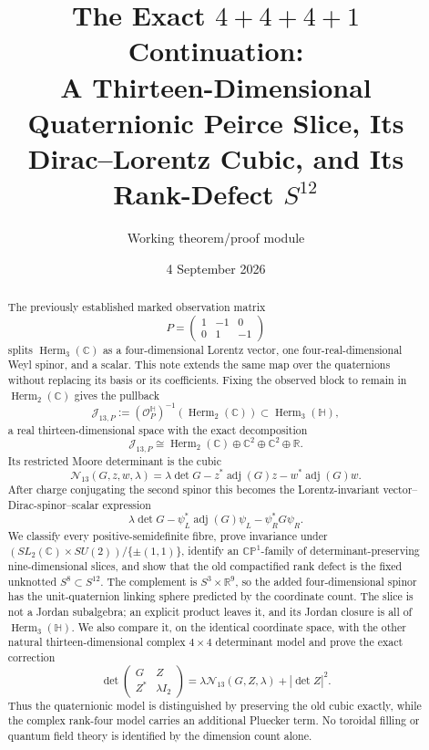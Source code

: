 \documentclass[11pt]{article}
\title{The Exact \texorpdfstring{$4+4+4+1$}{4+4+4+1} Continuation:\\
A Thirteen-Dimensional Quaternionic Peirce Slice, Its Dirac--Lorentz Cubic, and Its Rank-Defect \texorpdfstring{$S^{12}$}{S12}}
\author{Working theorem/proof module}
\date{4 September 2026}
\theoremstyle{definition}
\theoremstyle{remark}
\newcommand{\C}{\mathbb C}
\newcommand{\Hh}{\mathbb H}
\newcommand{\R}{\mathbb R}
\newcommand{\Z}{\mathbb Z}
\newcommand{\CP}{\mathbb {CP}}
\newcommand{\Herm}{\operatorname{Herm}}
\newcommand{\adj}{\operatorname{adj}}
\newcommand{\cJ}{\mathcal J}
\newcommand{\cN}{\mathcal N}
\newcommand{\cO}{\mathcal O}
\begin{document}
\maketitle

\begin{abstract}
The previously established marked observation matrix
\[
 P=\begin{pmatrix}1&-1&0\\0&1&-1\end{pmatrix}
\]
splits $\Herm_3(\C)$ as a four-dimensional Lorentz vector, one four-real-dimensional Weyl spinor, and a scalar.  This note extends the same map over the quaternions without replacing its basis or its coefficients.  Fixing the observed block to remain in $\Herm_2(\C)$ gives the pullback
\[
 \cJ_{13,P}:=(\cO_P^{\Hh})^{-1}(\Herm_2(\C))\subset\Herm_3(\Hh),
\]
a real thirteen-dimensional space with the exact decomposition
\[
 \cJ_{13,P}\cong\Herm_2(\C)\oplus\C^2\oplus\C^2\oplus\R.
\]
Its restricted Moore determinant is the cubic
\[
 \cN_{13}(G,z,w,\lambda)
 =\lambda\det G-z^*\adj(G)z-w^*\adj(G)w.
\]
After charge conjugating the second spinor this becomes the Lorentz-invariant vector--Dirac-spinor--scalar expression
\[
 \lambda\det G-\psi_L^*\adj(G)\psi_L-\psi_R^*G\psi_R.
\]
We classify every positive-semidefinite fibre, prove invariance under
$(SL_2(\C)\times SU(2))/\{\pm(1,1)\}$, identify an $\CP^1$-family of determinant-preserving nine-dimensional slices, and show that the old compactified rank defect is the fixed unknotted $S^8\subset S^{12}$.  The complement is $S^3\times\R^9$, so the added four-dimensional spinor has the unit-quaternion linking sphere predicted by the coordinate count.  The slice is not a Jordan subalgebra; an explicit product leaves it, and its Jordan closure is all of $\Herm_3(\Hh)$.  We also compare it, on the identical coordinate space, with the other natural thirteen-dimensional complex $4\times4$ determinant model and prove the exact correction
\[
 \det\begin{pmatrix}G&Z\\Z^*&\lambda I_2\end{pmatrix}
 =\lambda\cN_{13}(G,Z,\lambda)+|\det Z|^2.
\]
Thus the quaternionic model is distinguished by preserving the old cubic exactly, while the complex rank-four model carries an additional Pluecker term.  No toroidal filling or quantum field theory is identified by the dimension count alone.
\end{abstract}

\tableofcontents
\end{document}

